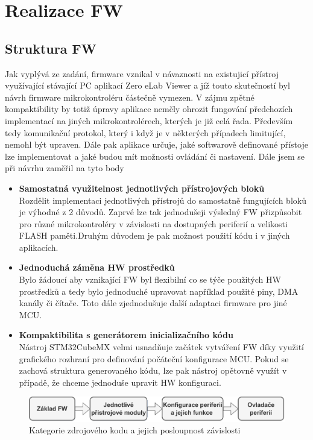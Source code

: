 
\chapter{Realizace FW}
\section{Struktura FW}
Jak vyplývá ze zadání, firmware vznikal v návaznosti na existujicí přístroj využívající stávající PC aplikací Zero eLab Viewer a jíž touto skutečností byl návrh firmware mikrokontroléru  částečně vymezen. V zájmu zpětné kompaktibility by totiž úpravy aplikace neměly ohrozit fungování předchozích implementací na jiných mikrokontrolérech, kterých je již celá řada. Především tedy  komunikační protokol, který i když je v některých případech limitující,  nemohl být upraven. Dále pak aplikace určuje, jaké softwarově definované přístoje lze implementovat a jaké budou mít možnosti ovládání či nastavení. Dále jsem se při návrhu zaměřil na tyto body

\begin{itemize}
	\item \textbf{Samostatná využitelnost jednotlivých přístrojových bloků}\\ 
	Rozdělit implementaci jednotlivých přístrojů do samostatně fungujících bloků je výhodné z 2 důvodů. Zaprvé lze tak jednodušeji výsledný FW přizpůsobit pro různé mikrokontroléry v závislosti na dostupných periferií a velikosti FLASH paměti.Druhým důvodem je pak možnost použití kódu i v jiných aplikacích.
	\item  \textbf{Jednoduchá záměna HW prostředků}\\
	Bylo žádoucí aby vznikající FW byl flexibilní co se týče použitých HW prostředků a tedy bylo jednoduché upravovat například použité piny, DMA kanály či čítače. Toto dále zjednodušuje další adaptaci firmware pro jiné MCU.	
	\item \textbf{Kompaktibilita s generátorem inicializačního kódu}\\	
	Nástroj STM32CubeMX velmi usnadňuje začátek vytváření FW díky využití grafického rozhraní pro definování počáteční konfigurace MCU. Pokud se zachová struktura generovaného kódu, lze pak nástroj opětovně využít v případě, že chceme jednoduše upravit HW konfiguraci.
\end{itemize}


\begin{figure}[H]
	\centering
	\includegraphics[width=0.9\linewidth]{Figs/Documentation/FW_Zavislosti}
	\caption{Kategorie zdrojového kodu a jejich posloupnost závislosti}
	\label{fig:fwzavislosti}
\end{figure}


